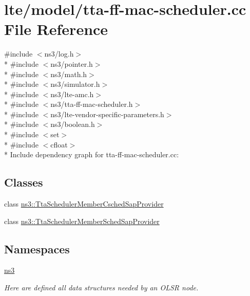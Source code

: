 \hypertarget{lte_2model_2tta-ff-mac-scheduler_8cc}{}\section{lte/model/tta-\/ff-\/mac-\/scheduler.cc File Reference}
\label{lte_2model_2tta-ff-mac-scheduler_8cc}
{\ttfamily \#include $<$ns3/log.\+h$>$}\\*
{\ttfamily \#include $<$ns3/pointer.\+h$>$}\\*
{\ttfamily \#include $<$ns3/math.\+h$>$}\\*
{\ttfamily \#include $<$ns3/simulator.\+h$>$}\\*
{\ttfamily \#include $<$ns3/lte-\/amc.\+h$>$}\\*
{\ttfamily \#include $<$ns3/tta-\/ff-\/mac-\/scheduler.\+h$>$}\\*
{\ttfamily \#include $<$ns3/lte-\/vendor-\/specific-\/parameters.\+h$>$}\\*
{\ttfamily \#include $<$ns3/boolean.\+h$>$}\\*
{\ttfamily \#include $<$set$>$}\\*
{\ttfamily \#include $<$cfloat$>$}\\*
Include dependency graph for tta-\/ff-\/mac-\/scheduler.cc\+:
\subsection*{Classes}
\begin{DoxyCompactItemize}
\item 
class \hyperlink{classns3_1_1TtaSchedulerMemberCschedSapProvider}{ns3\+::\+Tta\+Scheduler\+Member\+Csched\+Sap\+Provider}
\item 
class \hyperlink{classns3_1_1TtaSchedulerMemberSchedSapProvider}{ns3\+::\+Tta\+Scheduler\+Member\+Sched\+Sap\+Provider}
\end{DoxyCompactItemize}
\subsection*{Namespaces}
\begin{DoxyCompactItemize}
\item 
 \hyperlink{namespacens3}{ns3}
\begin{DoxyCompactList}\small\item\em Here are defined all data structures needed by an O\+L\+SR node. \end{DoxyCompactList}\end{DoxyCompactItemize}
